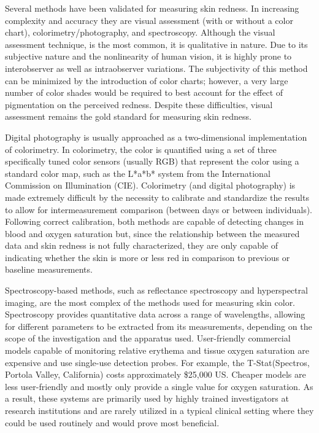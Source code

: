 Several methods have been validated for measuring skin redness. In increasing complexity and accuracy they are visual assessment (with or without a color chart), colorimetry/photography, and spectroscopy.\cite{Agache2004} Although the visual assessment technique,\cite{Trotti2003} is the most common, it is qualitative in nature. Due to its subjective nature and the nonlinearity of human vision, it is highly prone to interobserver as well as intraobserver variations.\cite{Bodekaer2013} The subjectivity of this method can be minimized by the introduction of color charts; however, a very large number of color shades would be required to best account for the effect of pigmentation on the perceived redness. Despite these difficulties, visual assessment remains the gold standard for measuring skin redness.\cite{Basketter1997,Wengstrom2004}

Digital photography is usually approached as a two-dimensional implementation of colorimetry. In colorimetry, the color is quantified using a set of three specifically tuned color sensors (usually RGB) that represent the color using a standard color map, such as the L*a*b* system from the International Commission on Illumination (CIE).\cite{CI2012} Colorimetry (and digital photography) is made extremely difficult by the necessity to calibrate and standardize the results to allow for intermeasurement comparison (between days or between individuals).\cite{Jung2012} Following correct calibration, both methods are capable of detecting changes in blood and oxygen saturation but, since the relationship between the measured data and skin redness is not fully characterized, they are only capable of indicating whether the skin is more or less red in comparison to previous or baseline measurements.\cite{Kollias2002,Canning2009,Nishidate2011,Setaro2002}

Spectroscopy-based methods, such as reflectance spectroscopy and hyperspectral imaging, are the most complex of the methods used for measuring skin color.\cite{Zhang2005,Stamatas2008,Kollias2010,Yudovsky2010,Chin2012} Spectroscopy provides quantitative data across a range of wavelengths, allowing for different parameters to be extracted from its measurements, depending on the scope of the investigation and the apparatus used. User-friendly commercial models capable of monitoring relative erythema and tissue oxygen saturation are expensive and use single-use detection probes. For example, the T-Stat\textregistered (Spectros, Portola Valley, California) costs approximately \$25,000 US.\cite{Fox2012} Cheaper models are less user-friendly and mostly only provide a single value for oxygen saturation. As a result, these systems are primarily used by highly trained investigators at research institutions and are rarely utilized in a typical clinical setting where they could be used routinely and would prove most beneficial.

